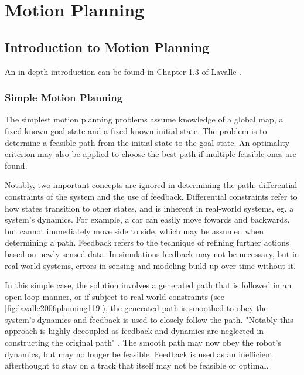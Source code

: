 \chapter{Motion Planning}
\section{Introduction to Motion Planning}
An in-depth introduction can be found in Chapter 1.3 of Lavalle
\cite{lavalle2006planning}.

\subsection{Simple Motion Planning}
The simplest motion planning problems assume knowledge of a global map, a fixed
known goal state and a fixed known initial state. The problem is to determine a
feasible path from the initial state to the goal state. An optimality criterion
may also be applied to choose the best path if multiple feasible ones are found.

Notably, two important concepts are ignored in determining the path:
differential constraints of the system and the use of feedback. Differential
constraints refer to how states transition to other states, and is inherent in
real-world systems, eg. a system's dynamics. For example, a car can easily move
fowards and backwards, but cannot immediately move side to side, which may be
assumed when determining a path. Feedback refers to the technique of refining
further actions based on newly sensed data. In simulations feedback may not be
necessary, but in real-world systems, errors in sensing and modeling build up
over time without it.

In this simple case, the solution involves a generated path that is followed in
an open-loop manner, or if subject to real-world constraints (see
\autoref{fig:lavalle2006planning119}), the generated path is smoothed to obey
the system's dynamics and feedback is used to closely follow the path. "Notably
this approach is highly decoupled as feedback and dynamics are neglected in
constructing the original path" \cite{lavalle2006planning}. The smooth path may
now obey the robot's dynamics, but may no longer be feasible. Feedback is used
as an inefficient afterthought to stay on a track that itself may not be
feasible or optimal.


